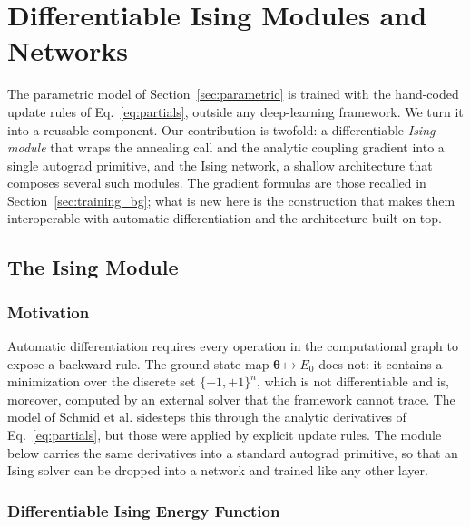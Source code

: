 \documentclass{ieeeaccess}
\begin{document}
\section{Differentiable Ising Modules and Networks}\label{sec:proposal}

The parametric model of Section~\ref{sec:parametric} is trained with the
hand-coded update rules of Eq.~\eqref{eq:partials}, outside any
deep-learning framework. We turn it into a reusable component. Our
contribution is twofold: a differentiable \emph{Ising module} that wraps the
annealing call and the analytic coupling gradient into a single autograd
primitive, and the Ising network, a shallow architecture that composes
several such modules. The gradient formulas are those recalled in
Section~\ref{sec:training_bg}; what is new here is the construction that makes
them interoperable with automatic differentiation and the architecture built
on top.

\subsection{The Ising Module}

\subsubsection{Motivation}

Automatic differentiation requires every operation in the computational graph
to expose a backward rule. The ground-state map $\boldsymbol{\theta} \mapsto E_0$
does not: it contains a minimization over the discrete set $\{-1,+1\}^n$,
which is not differentiable and is, moreover, computed by an external solver
that the framework cannot trace. The model of Schmid et al. sidesteps this
through the analytic derivatives of Eq.~\eqref{eq:partials}, but those were
applied by explicit update rules. The module below carries the same
derivatives into a standard autograd primitive, so that an Ising solver can be
dropped into a network and trained like any other layer.

\subsubsection{Differentiable Ising Energy Function}
\end{document}
